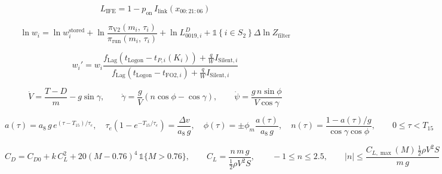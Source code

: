 \begin{equation}
  L_{\mathrm{IFE}} = 1 - p_{\mathrm{on}}\, I_{\mathrm{link}}\left(x_{00{:}21{:}06}\right)
  \label{eq:A6}
\end{equation}

\begin{equation}
  \ln w_{i} = \ln w_{i}^{\mathrm{stored}} + \ln \frac{\pi_{\mathrm{V2}}\left(m_{i},\, \tau_{i}\right)}{\pi_{\mathrm{run}}\left(m_{i},\, \tau_{i}\right)} + \ln L_{0019,i}^{D} + \mathbb{1}\left\{i \in S_{2}\right\} \Delta \ln Z_{\mathrm{filter}}
  \label{eq:A7}
\end{equation}

\begin{equation}
  w_{i}' = w_{i} \frac{f_{\mathrm{Lag}}\left(t_{\mathrm{Logon}} - t_{P,i}\left(K_{i}\right)\right) + \frac{q}{W} I_{\mathrm{Silent},i}}{f_{\mathrm{Lag}}\left(t_{\mathrm{Logon}} - t_{\mathrm{FO2},i}\right) + \frac{q}{W} I_{\mathrm{Silent},i}}
  \label{eq:A8}
\end{equation}

\begin{equation}
  \dot{V} = \frac{T - D}{m} - g\sin\gamma, \qquad \dot{\gamma} = \frac{g}{V}\left(n\cos\phi - \cos\gamma\right), \qquad \dot{\psi} = \frac{g\, n\sin\phi}{V\cos\gamma}
  \label{eq:A9}
\end{equation}

\begin{equation}
  a(\tau) = a_{8}\, g\, e^{(\tau - T_{15})/\tau_{e}}, \quad \tau_{e}\left(1 - e^{-T_{15}/\tau_{e}}\right) = \frac{\Delta v}{a_{8}\, g}, \quad \phi(\tau) = \pm\phi_{m}\frac{a(\tau)}{a_{8}\, g}, \quad n(\tau) = \frac{1 - a(\tau)/g}{\cos\gamma\cos\phi}, \qquad 0 \le \tau < T_{15}
  \label{eq:A10}
\end{equation}

\begin{equation}
  C_{D} = C_{D0} + k\, C_{L}^{2} + 20\left(M - 0.76\right)^{4}\, \mathbb{1}\{M > 0.76\}, \qquad C_{L} = \frac{n\, m\, g}{\tfrac{1}{2}\rho V^{2} S}, \qquad -1 \le n \le 2.5, \qquad \left|n\right| \le \frac{C_{L,\max}(M)\, \tfrac{1}{2}\rho V^{2} S}{m\, g}
  \label{eq:A11}
\end{equation}

